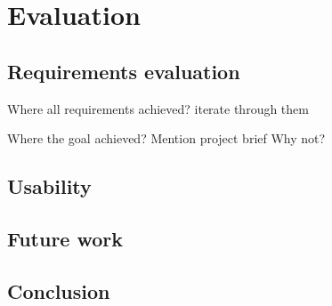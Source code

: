 \section{Evaluation}

\subsection{Requirements evaluation}
Where all requirements achieved? iterate through them

Where the goal achieved? %
Mention project brief
Why not?

\subsection{Usability}


\subsection{Future work}\label{future-work}

\subsection{Conclusion}

